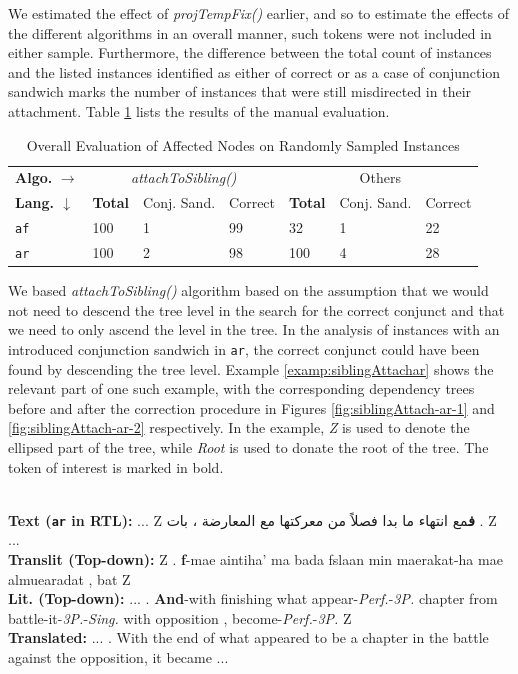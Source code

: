 We estimated the effect of \textit{projTempFix()} earlier, and so to estimate the effects of the different algorithms in an overall manner, such tokens were not included in either sample. Furthermore, the difference between the total count of instances and the listed instances identified as either of correct or as a case of conjunction sandwich marks the number of instances that were still misdirected in their attachment. Table \ref{tab:evalOverall} lists the results of the manual evaluation.

\begin{table}[H]
    \centering
    \begin{tabular}{|l|l|l|l|l|l|l|}
    \hline
    \multicolumn{1}{|l|}{\textbf{Algo.} \(\rightarrow\)} &
    \multicolumn{3}{c|}{\textit{attachToSibling()}} &
    \multicolumn{3}{c|}{Others}\\
    \textbf{Lang. \(\downarrow\)} & \textbf{Total} & Conj. Sand. & Correct & \textbf{Total} & Conj. Sand. & Correct\\
    \hline
    \texttt{af} & 100 & 1 & 99 & 32 & 1 & 22\\
    \texttt{ar} & 100 & 2 & 98 & 100 & 4 & 28\\
    \hline
    \end{tabular}
    \caption{Overall Evaluation of Affected Nodes on Randomly Sampled Instances}
    \label{tab:evalOverall}
\end{table}

We based \textit{attachToSibling()} algorithm based on the assumption that we would not need to descend the tree level in the search for the correct conjunct and that we need to only ascend the level in the tree. In the analysis of instances with an introduced conjunction sandwich in \verb|ar|, the correct conjunct could have been found by descending the tree level. Example \ref{examp:siblingAttachar} shows the relevant part of one such example, with the corresponding dependency trees before and after the correction procedure in Figures \ref{fig:siblingAttach-ar-1} and \ref{fig:siblingAttach-ar-2} respectively. In the example, \textit{Z} is used to denote the ellipsed part of the tree, while \textit{Root} is used to donate the root of the tree. The token of interest is marked in bold.

\begin{example}
\label{examp:siblingAttachar}
\textbf{ }\\
\textbf{Text (\texttt{ar} in RTL):} ... Z \textarabic{
\textbf{ف}مع  انتهاء   ما بدا فصلاً من معركتها مع المعارضة ، بات }
. Z ...\\
\textbf{Translit (Top-down):} Z . \textbf{f}-mae aintiha' ma bada fslaan min maerakat-ha mae almuearadat , bat Z\\
\textbf{Lit. (Top-down):} ... . \textbf{And}-with finishing what appear-\textit{Perf.}-\textit{3P.} chapter from battle-it-\textit{3P.}-\textit{Sing.} with opposition , become-\textit{Perf.}-\textit{3P.} Z\\
\textbf{Translated:} ... . With the end of what appeared to be a chapter in the battle against the opposition, it became ...  
\end{example}

